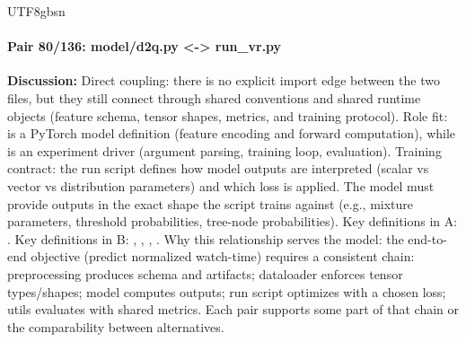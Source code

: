 \documentclass[11pt]{article}
\begin{document}
\begin{CJK*}{UTF8}{gbsn}
\paragraph{Pair 80/136: model/d2q.py <-> run\_vr.py}
\textbf{Discussion:} Direct coupling: there is no explicit import edge between the two files, but they still connect through shared conventions and shared runtime objects (feature schema, tensor shapes, metrics, and training protocol). Role fit: \texttt{} is a PyTorch model definition (feature encoding and forward computation), while \texttt{} is an experiment driver (argument parsing, training loop, evaluation). Training contract: the run script defines how model outputs are interpreted (scalar vs vector vs distribution parameters) and which loss is applied. The model must provide outputs in the exact shape the script trains against (e.g., mixture parameters, threshold probabilities, tree-node probabilities). Key definitions in A: \texttt{}. Key definitions in B: \texttt{}, \texttt{}, \texttt{}, \texttt{}. Why this relationship serves the model: the end-to-end objective (predict normalized watch-time) requires a consistent chain: preprocessing produces schema and artifacts; dataloader enforces tensor types/shapes; model computes outputs; run script optimizes with a chosen loss; utils evaluates with shared metrics. Each pair supports some part of that chain or the comparability between alternatives.


\end{CJK*}
\end{document}
